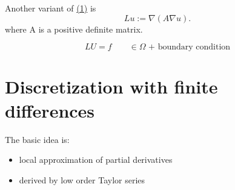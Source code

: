 Another variant of \href{eq:eq_1}{(1)} is
\[
	Lu := \nabla(A\nabla u)
.\] 
where A is a positive definite matrix.

\begin{equation} \label{eq:eq_2}\tag{2}
LU = f \qquad \in \Omega \text{ + boundary condition}
\end{equation}

\section{Discretization with finite differences}%
\label{sec:Discretization with finite differences}

The basic idea is:

\begin{itemize}
	\item local approximation of partial derivatives
	\item derived by low order Taylor series
\end{itemize}

